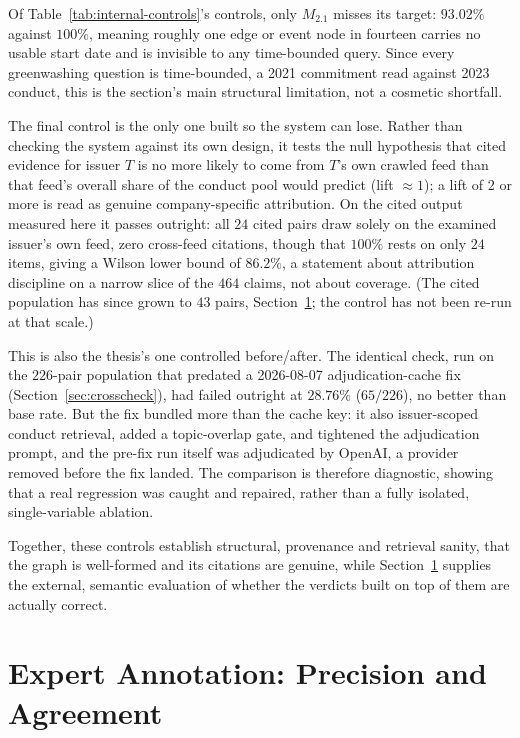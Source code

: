 \documentclass[fontsize=12pt,oneside,headings=small]{scrreprt}
\begin{document}
Of Table~\ref{tab:internal-controls}'s controls, only $M_{2.1}$ misses its target: $93.02\%$ against $100\%$, meaning roughly one edge or event node in fourteen carries no usable start date and is invisible to any time-bounded query. Since every greenwashing question is time-bounded, a 2021 commitment read against 2023 conduct, this is the section's main structural limitation, not a cosmetic shortfall.

The final control is the only one built so the system can lose. Rather than checking the system against its own design, it tests the null hypothesis that cited evidence for issuer $T$ is no more likely to come from $T$'s own crawled feed than that feed's overall share of the conduct pool would predict (lift $\approx 1$); a lift of $2$ or more is read as genuine company-specific attribution. On the cited output measured here it passes outright: all $24$ cited pairs draw solely on the examined issuer's own feed, zero cross-feed citations, though that $100\%$ rests on only $24$ items, giving a Wilson lower bound of $86.2\%$, a statement about attribution discipline on a narrow slice of the $464$ claims, not about coverage. (The cited population has since grown to $43$ pairs, Section~\ref{sec:experiment-expert}; the control has not been re-run at that scale.)

This is also the thesis's one controlled before/after. The identical check, run on the $226$-pair population that predated a 2026-08-07 adjudication-cache fix (Section~\ref{sec:crosscheck}), had failed outright at $28.76\%$ ($65/226$), no better than base rate. But the fix bundled more than the cache key: it also issuer-scoped conduct retrieval, added a topic-overlap gate, and tightened the adjudication prompt, and the pre-fix run itself was adjudicated by OpenAI, a provider removed before the fix landed. The comparison is therefore diagnostic, showing that a real regression was caught and repaired, rather than a fully isolated, single-variable ablation.

Together, these controls establish structural, provenance and retrieval sanity, that the graph is well-formed and its citations are genuine, while Section~\ref{sec:experiment-expert} supplies the external, semantic evaluation of whether the verdicts built on top of them are actually correct.

\section{Expert Annotation: Precision and Agreement}
\label{sec:experiment-expert}
\end{document}
